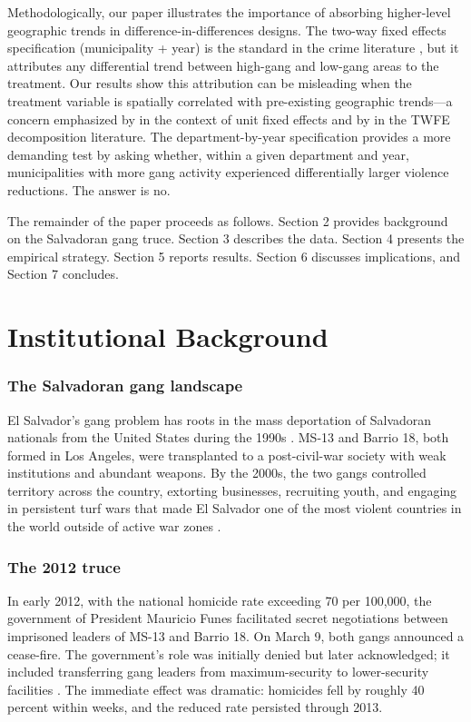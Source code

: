 \documentclass[12pt]{article}
\begin{document}
Methodologically, our paper illustrates the importance of absorbing higher-level geographic trends in difference-in-differences designs. The two-way fixed effects specification (municipality + year) is the standard in the crime literature \citep{chalfin_mccrary2018, draca_etal2011}, but it attributes any differential trend between high-gang and low-gang areas to the treatment. Our results show this attribution can be misleading when the treatment variable is spatially correlated with pre-existing geographic trends---a concern emphasized by \citet{imai_kim2021} in the context of unit fixed effects and by \citet{goodman-bacon2021} in the TWFE decomposition literature. The department-by-year specification provides a more demanding test by asking whether, within a given department and year, municipalities with more gang activity experienced differentially larger violence reductions. The answer is no.

The remainder of the paper proceeds as follows. Section 2 provides background on the Salvadoran gang truce. Section 3 describes the data. Section 4 presents the empirical strategy. Section 5 reports results. Section 6 discusses implications, and Section 7 concludes.


\section{Institutional Background}

\subsubsection*{The Salvadoran gang landscape} El Salvador's gang problem has roots in the mass deportation of Salvadoran nationals from the United States during the 1990s \citep{sviatschi2022}. MS-13 and Barrio 18, both formed in Los Angeles, were transplanted to a post-civil-war society with weak institutions and abundant weapons. By the 2000s, the two gangs controlled territory across the country, extorting businesses, recruiting youth, and engaging in persistent turf wars that made El Salvador one of the most violent countries in the world outside of active war zones \citep{soares_naritomi2010}.

\subsubsection*{The 2012 truce} In early 2012, with the national homicide rate exceeding 70 per 100,000, the government of President Mauricio Funes facilitated secret negotiations between imprisoned leaders of MS-13 and Barrio 18. On March 9, both gangs announced a cease-fire. The government's role was initially denied but later acknowledged; it included transferring gang leaders from maximum-security to lower-security facilities \citep{cruz_duran2016}. The immediate effect was dramatic: homicides fell by roughly 40 percent within weeks, and the reduced rate persisted through 2013.
\end{document}
